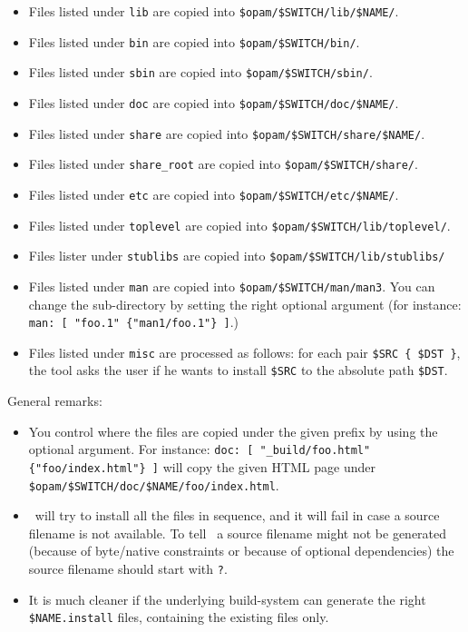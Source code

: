 \documentclass[a4paper,10pt]{article}
\begin{document}
\begin{itemize}
\item Files listed under {\tt lib} are copied into \verb+$opam/$SWITCH/lib/$NAME/+.
\item Files listed under {\tt bin} are copied into \verb+$opam/$SWITCH/bin/+.
\item Files listed under {\tt sbin} are copied into \verb+$opam/$SWITCH/sbin/+.
\item Files listed under {\tt doc} are copied into \verb+$opam/$SWITCH/doc/$NAME/+.
\item Files listed under {\tt share} are copied into \verb+$opam/$SWITCH/share/$NAME/+.
\item Files listed under {\tt share_root} are copied into \verb+$opam/$SWITCH/share/+.
\item Files listed under {\tt etc} are copied into \verb+$opam/$SWITCH/etc/$NAME/+.
\item Files listed under {\tt toplevel} are copied into \verb+$opam/$SWITCH/lib/toplevel/+.
\item Files lister under {\tt stublibs} are copied into \verb+$opam/$SWITCH/lib/stublibs/+
\item Files listed under {\tt man} are copied into
  \verb+$opam/$SWITCH/man/man3+. You can change the sub-directory by setting
  the right optional argument (for instance:
  \verb+man: [ "foo.1" {"man1/foo.1"} ]+.)
\item Files listed under {\tt misc} are processed as follows:
  for each pair \verb+$SRC { $DST }+, the tool asks the user if
  he wants to install \verb+$SRC+ to the absolute path \verb+$DST+.
\end{itemize}

General remarks:
\begin{itemize}

\item You control where the files are copied under the given prefix by
  using the optional argument. For instance:
  \verb+doc: [ "_build/foo.html" {"foo/index.html"} ]+ will copy the
  given HTML page under \verb+$opam/$SWITCH/doc/$NAME/foo/index.html+.

\item \OPAM\ will try to install all the files in sequence, and it will
  fail in case a source filename is not available. To tell \OPAM\ a
  source filename might not be generated (because of byte/native
  constraints or because of optional dependencies) the source filename
  should start with \verb+?+.

\item It is much cleaner if the underlying build-system can generate
  the right \verb+$NAME.install+ files, containing the existing files only.

\end{itemize}
\end{document}
